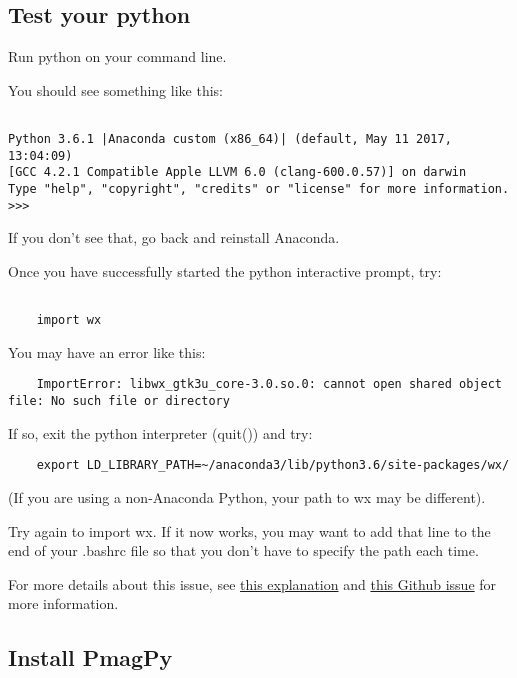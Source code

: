\documentclass[11pt]{article}
\begin{document}
\subsection{Test your python}

Run python on your command line.

You should see something like this: \begin{verbatim}

Python 3.6.1 |Anaconda custom (x86_64)| (default, May 11 2017, 13:04:09)
[GCC 4.2.1 Compatible Apple LLVM 6.0 (clang-600.0.57)] on darwin
Type "help", "copyright", "credits" or "license" for more information.
>>>\end{verbatim}

If you don't see that, go back and reinstall Anaconda.

Once you have successfully started the python interactive prompt, try:
\begin{verbatim}

    import wx

\end{verbatim}
You may have an error like this:
\begin{verbatim}
    ImportError: libwx_gtk3u_core-3.0.so.0: cannot open shared object file: No such file or directory

\end{verbatim}

If so, exit the python interpreter (quit()) and try:
  \begin{verbatim}
    export LD_LIBRARY_PATH=~/anaconda3/lib/python3.6/site-packages/wx/

\end{verbatim}

(If you are using a non-Anaconda Python, your path to wx may be different).

Try again to import wx.  If it now works, you may want to add that line to the end of your .bashrc file so that you don't have to specify the path each time.

For more details about this issue, see \href{https://github.com/wxWidgets/Phoenix/blob/e13273c5d939d993abf2a2649e90b3ea0d39382c/packaging/README-bdist.txt#L38-L57}{this explanation} and \href{https://github.com/pyenv/pyenv/issues/691}{this Github issue} for more information.


\subsection{Install PmagPy}
\end{document}
